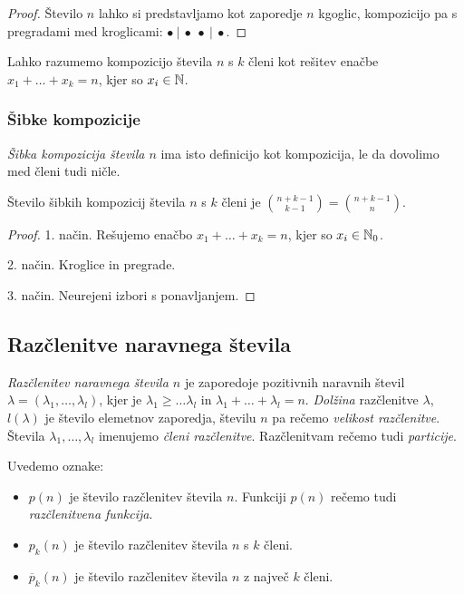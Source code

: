 \begin{proof}
    Število $n$ lahko si predstavljamo kot zaporedje $n$ kgoglic, kompozicijo pa s pregradami med kroglicami: $\bullet~|~\bullet~\bullet~|~\bullet$.
\end{proof}

\begin{opomba}
    Lahko razumemo kompozicijo števila $n$ s $k$ členi kot rešitev enačbe $x_1 + \ldots + x_k = n$, kjer so $x_i \in \mathbb{N}$.
\end{opomba}

\subsubsection{Šibke kompozicije}
\emph{Šibka kompozicija števila $n$} ima isto definicijo kot kompozicija, le da dovolimo med členi tudi ničle.

\begin{trditev}
    Število šibkih kompozicij števila $n$ s $k$ členi je $\binom{n+k-1}{k-1} = \binom{n+k-1}{n}$.
\end{trditev}

\begin{proof}
    1. način. Rešujemo enačbo $x_1 + \ldots + x_k = n$, kjer so $x_i \in \mathbb{N}_0$.

    2. način. Kroglice in pregrade.

    3. način. Neurejeni izbori s ponavljanjem.
\end{proof}

\subsection{Razčlenitve naravnega števila}
\begin{definicija}
    \emph{Razčlenitev naravnega števila $n$} je zaporedoje pozitivnih naravnih števil $\lambda = (\lambda_1, \ldots, \lambda_l)$, kjer je $\lambda_1 \geq \ldots \lambda_l$ in $\lambda_1 + \ldots + \lambda_l = n$. \emph{Dolžina} razčlenitve $\lambda$, $l(\lambda)$ je število elemetnov zaporedja, številu $n$ pa rečemo \emph{velikost razčlenitve}. Števila $\lambda_1, \ldots, \lambda_l$ imenujemo \emph{členi razčlenitve}. Razčlenitvam rečemo tudi \emph{particije}.
\end{definicija}

Uvedemo oznake:
\begin{itemize}
    \item $p(n)$ je število razčlenitev števila $n$. Funkciji $p(n)$ rečemo tudi \emph{razčlenitvena funkcija}.
    \item $p_k(n)$ je število razčlenitev števila $n$ s $k$ členi.
    \item $\overline{p}_k(n)$ je število razčlenitev števila $n$ z največ $k$ členi.
\end{itemize}


